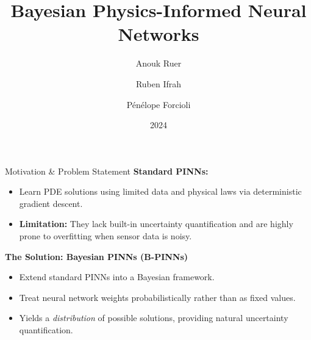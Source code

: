 \documentclass[10pt, aspectratio=169]{beamer}
\title[Bayesian PINNs]{Bayesian Physics-Informed Neural Networks}
\author[Ruer, Ifrah, Forcioli]{Anouk Ruer \and Ruben Ifrah \and P\'en\'elope Forcioli}
\date{2024}
\begin{document}
\begin{frame}
    \titlepage
\end{frame}


\begin{frame}{Motivation \& Problem Statement}
    \textbf{Standard PINNs:}
    \begin{itemize}
        \item Learn PDE solutions using limited data and physical laws via deterministic gradient descent.
        \item \textbf{Limitation:} They lack built-in uncertainty quantification and are highly prone to overfitting when sensor data is noisy.
    \end{itemize}
    \vspace{0.5cm}
    \textbf{The Solution: Bayesian PINNs (B-PINNs) \cite{Yang_2021}}
    \begin{itemize}
        \item Extend standard PINNs into a Bayesian framework.
        \item Treat neural network weights probabilistically rather than as fixed values.
        \item Yields a \textit{distribution} of possible solutions, providing natural uncertainty quantification.
    \end{itemize}
\end{frame}
\end{document}
